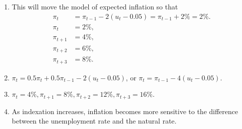 \documentclass[12pt]{article}
\begin{document}
\begin{enumerate}[label=\arabic*.]
\begin{enumerate}[label=(\alph*)]
        \item This will move the model of expected inflation so that
        \begin{align*}
            \pi_t &= \pi_{t-1} - 2(u_t - 0.05) = \pi_{t-1} + 2\% = 2\%.\\
            \pi_t &= 2\%,\\
            \pi_{t+1} &= 4\%,\\
            \pi_{t+2} &= 6\%,\\
            \pi_{t+3} &= 8\%.
        \end{align*}
        \item $\pi_t = 0.5 \pi_t + 0.5 \pi_{t-1} - 2(u_t - 0.05)$, or $\pi_t = \pi_{t-1} - 4(u_t-0.05)$.
        \item $\pi_t = 4\%, \pi_{t+1} = 8\%, \pi_{t+2} = 12\%, \pi_{t+3} = 16\%$.
        \item As indexation increases, inflation becomes more sensitive to the difference between the unemployment rate and the natural rate.
    \end{enumerate}
\end{enumerate}
\end{document}
